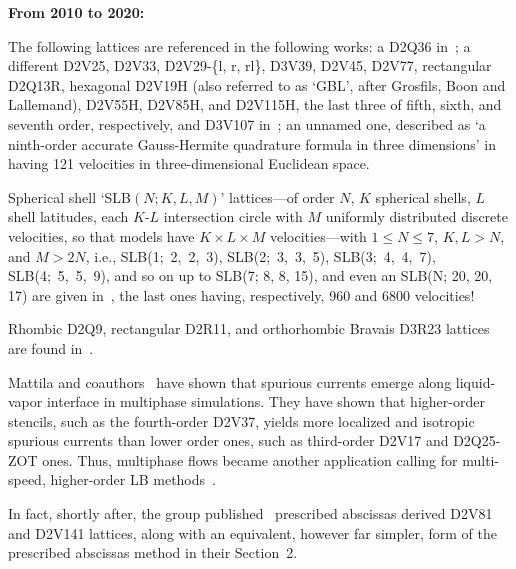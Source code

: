     \vspace{2.0mm}\noindent\textbf{From 2010 to 2020:}\vspace{1.0mm}

    The      following      lattices      are      referenced      in       the       following       works:       a       D2Q36
    in~\cite[p.~452]{2010-AidunCK+ClausenJR-AnnuRevFluidMech}; a different D2V25,  D2V33,  D2V29-\{l,  r,  rl\},  D3V39,  D2V45,
    D2V77, rectangular D2Q13R, hexagonal D2V19H (also referred to as `GBL', after Grosfils, Boon and Lallemand), D2V55H, D2V85H,
    and D2V115H, the last three of fifth, sixth, and seventh order, respectively, and D3V107 in~\cite{2010-HegeleLA-DrUFSC};  an
    unnamed  one,  described  as   `a   ninth-order   accurate   Gauss-Hermite   quadrature   formula   in   three   dimensions'
    in~\cite{2008-NieX+ChenH-PhysRevE} having 121 velocities in three-dimensional Euclidean space.

    Spherical shell `SLB$(N; K, L, M)$' lattices---of order $N$,  $K$  spherical  shells,  $L$  shell  latitudes,  each  $K$-$L$
    intersection circle with $M$ uniformly distributed  discrete  velocities,  so  that  models  have  $K  \times  L  \times  M$
    velocities---with $1 \leqslant N \leqslant  7$,  $K,  L  >  N$,  and  $M  >  2N$,  i.e.,  SLB(1;~2,~2,~3),  SLB(2;~3,~3,~5),
    SLB(3;~4,~4,~7), SLB(4;~5,~5,~9), and so  on  up  to  SLB(7;  8,  8,  15),  and  even  an  SLB(N;  20,  20,  17)  are  given
    in~\cite{2012-AmbrusVE+SofoneaV-PhysRevE}, the last ones having, respectively, 960 and 6800 velocities!

    Rhombic     D2Q9,     rectangular     D2R11,     and     orthorhombic     Bravais     D3R23     lattices      are      found
    in~\cite{2013-HegeleJr+PhilippiPC-JSciComput}.

    Mattila  and  coauthors~\cite{2013-MattilaKK+PhilippiPC-IntJModPhysC}  have  shown  that  spurious  currents  emerge   along
    liquid-vapor interface in multiphase simulations. They have shown that  higher-order  stencils,  such  as  the  fourth-order
    D2V37, yields more localized and isotropic spurious currents than lower order ones, such as third-order D2V17 and  D2Q25-ZOT
    ones.   Thus,   multiphase   flows   became   another    application    calling    for    multi-speed,    higher-order    LB
    methods~\cite{2014-SiebertDN+MattilaKK-PhysRevE}.

    In fact, shortly after, the group published~\cite{2014-MattilaKK+PhilippiPC-SciWorldJ} prescribed  abscissas  derived  D2V81
    and D2V141 lattices, along with an equivalent, however far simpler,  form  of  the  prescribed  abscissas  method  in  their
    Section~2.

